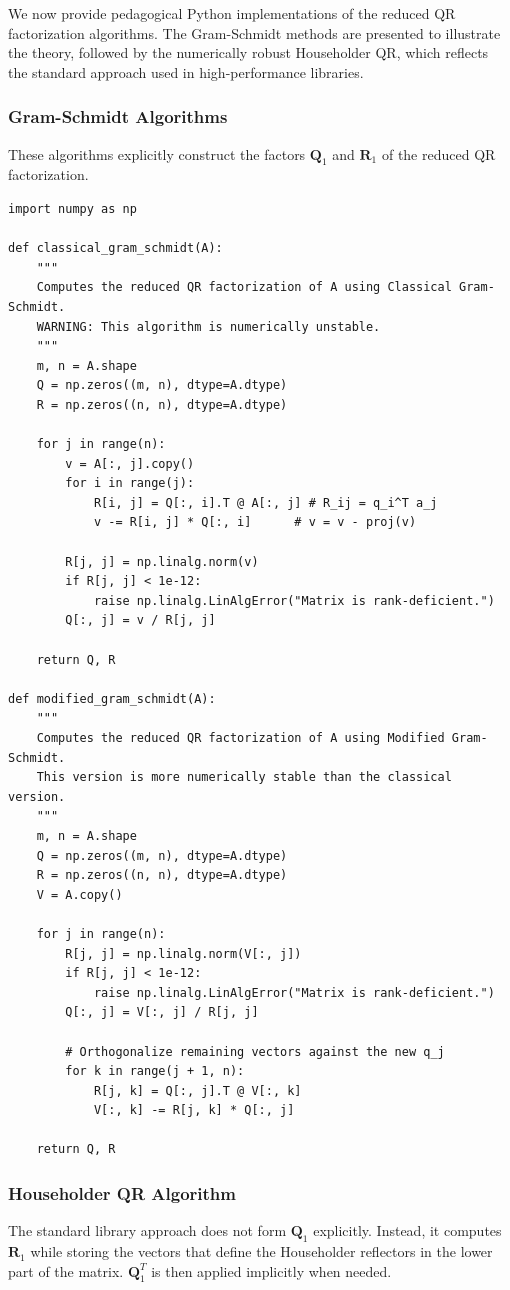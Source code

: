 We now provide pedagogical Python implementations of the reduced QR factorization algorithms. The Gram-Schmidt methods are presented to illustrate the theory, followed by the numerically robust Householder QR, which reflects the standard approach used in high-performance libraries.

\subsubsection*{Gram-Schmidt Algorithms}
These algorithms explicitly construct the factors $\mathbf{Q}_1$ and $\mathbf{R}_1$ of the reduced QR factorization.

\begin{verbatim}
import numpy as np

def classical_gram_schmidt(A):
    """
    Computes the reduced QR factorization of A using Classical Gram-Schmidt.
    WARNING: This algorithm is numerically unstable.
    """
    m, n = A.shape
    Q = np.zeros((m, n), dtype=A.dtype)
    R = np.zeros((n, n), dtype=A.dtype)
    
    for j in range(n):
        v = A[:, j].copy()
        for i in range(j):
            R[i, j] = Q[:, i].T @ A[:, j] # R_ij = q_i^T a_j
            v -= R[i, j] * Q[:, i]      # v = v - proj(v)
            
        R[j, j] = np.linalg.norm(v)
        if R[j, j] < 1e-12:
            raise np.linalg.LinAlgError("Matrix is rank-deficient.")
        Q[:, j] = v / R[j, j]
        
    return Q, R

def modified_gram_schmidt(A):
    """
    Computes the reduced QR factorization of A using Modified Gram-Schmidt.
    This version is more numerically stable than the classical version.
    """
    m, n = A.shape
    Q = np.zeros((m, n), dtype=A.dtype)
    R = np.zeros((n, n), dtype=A.dtype)
    V = A.copy()
    
    for j in range(n):
        R[j, j] = np.linalg.norm(V[:, j])
        if R[j, j] < 1e-12:
            raise np.linalg.LinAlgError("Matrix is rank-deficient.")
        Q[:, j] = V[:, j] / R[j, j]
        
        # Orthogonalize remaining vectors against the new q_j
        for k in range(j + 1, n):
            R[j, k] = Q[:, j].T @ V[:, k]
            V[:, k] -= R[j, k] * Q[:, j]
            
    return Q, R
\end{verbatim}

\subsubsection*{Householder QR Algorithm}
The standard library approach does not form $\mathbf{Q}_1$ explicitly. Instead, it computes $\mathbf{R}_1$ while storing the vectors that define the Householder reflectors in the lower part of the matrix. $\mathbf{Q}_1^T$ is then applied implicitly when needed.

